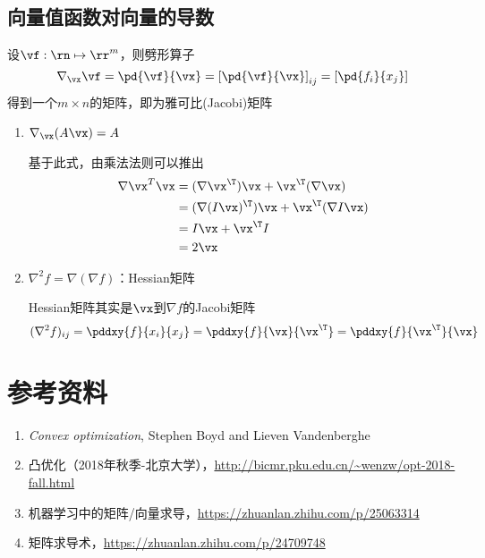 \subsection{向量值函数对向量的导数}
设$\vf:\rn\mapsto\rr^m$，则劈形算子
\[\nabla_{\vx}\vf=\pd{\vf}{\vx}=\left[\pd{\vf}{\vx}\right]_{ij}=\left[\pd{f_i}{x_j}\right]\]
得到一个$m\times n$的矩阵，即为雅可比(Jacobi)矩阵
\begin{enumerate}
    \item $\nabla_\vx(A\vx)=A$
    \begin{analysis}
        基于此式，由乘法法则可以推出
        \[\begin{aligned}
            \nabla\vx^T\vx&=(\nabla \vx^\T)\vx+\vx^\T(\nabla \vx)\\
            &=(\nabla (I\vx)^\T)\vx+\vx^\T(\nabla I\vx)\\
            &=I\vx+\vx^\T I\\
            &=2\vx
        \end{aligned}\]
    \end{analysis}
    \item $\nabla^2 f=\nabla(\nabla f)$：Hessian矩阵
    \begin{analysis}
        Hessian矩阵其实是$\vx$到$\nabla f$的Jacobi矩阵
        \[(\nabla^2 f)_{ij}=\pddxy{f}{x_i}{x_j}=\pddxy{f}{\vx}{\vx^\T}=\pddxy{f}{\vx^\T}{\vx}\]
    \end{analysis}
\end{enumerate}

\section{参考资料}
\begin{enumerate}
    \item \emph{Convex optimization}, Stephen Boyd and Lieven Vandenberghe
    \item 凸优化（2018年秋季-北京大学），\url{http://bicmr.pku.edu.cn/~wenzw/opt-2018-fall.html}
    \item 机器学习中的矩阵/向量求导，\url{https://zhuanlan.zhihu.com/p/25063314}
    \item 矩阵求导术，\url{https://zhuanlan.zhihu.com/p/24709748}
\end{enumerate}

